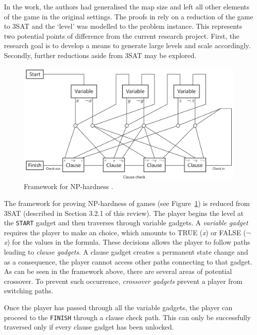 \documentclass[11pt, a4paper, oneside]{report} %
\begin{document}
In the work, the authors had generalised the map size and left all other
elements of the game in the original settings. The proofs in \cite{Aloupis2012}
rely on a reduction of the game to 3SAT and the `level' was modelled to the
problem instance. This represents two potential points of difference from the
current research project. First, the research goal is to develop a means to
generate large levels and scale accordingly. Secondly, further reductions aside
from 3SAT may be explored.  \\

\begin{figure}[h!]

  \centering
    \includegraphics[scale=0.35]{aloupis_nphardness}
  \caption{Framework for NP-hardness \cite{Aloupis2012}.}
  \label{NP_hard}
\end{figure}

The framework for proving NP-hardness of games (see Figure~\ref{NP_hard}) is
reduced from 3SAT (described in Section 3.2.1 of this review). The player begins
the level at the \texttt{START} gadget and then traverses through variable
gadgets. A \textit{variable gadget} requires the player to make an choice, which
amounts to TRUE (\textit{x}) or FALSE (\( \neg \)\textit{x}) for the values in
the formula. These decisions allows the player to follow paths leading to
\textit{clause gadgets}. A clause gadget creates a permanent state change and as
a consequence, the player cannot access other paths connecting to that gadget.
As can be seen in the framework above, there are several areas of potential
crossover. To prevent such occurrence, \textit{crossover gadgets} prevent a
player from switching paths.

Once the player has passed through all the variable gadgets, the player can
proceed to the \texttt{FINISH} through a clause check path. This can only be
successfully traversed only if every clause gadget has been unlocked.
\end{document}
